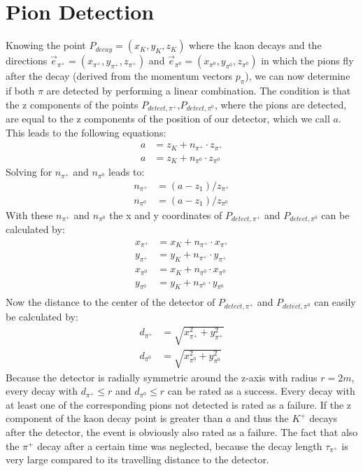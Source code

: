 \documentclass[a4paper,parskip,11pt, DIV12]{scrreprt}
\begin{document}
\clearpage


\section{Pion Detection} \label{sec:pdetection}

Knowing the point $P_{decay}=(x_K,y_K,z_K)$  where the kaon decays and the directions $\vec{e}_{\pi^+}=(x_{\pi^+},y_{\pi^+},z_{\pi^+})$ and $\vec{e}_{\pi^0}=(x_{\pi^0},y_{\pi^0},z_{\pi^0})$ in which the pions fly after the decay (derived from the momentum vectors $p_{\pi}$), we can now determine if both $\pi$ are detected by performing a linear combination. The condition is that the z components of the points $P_{detect,\pi^+}$,$P_{detect,\pi^0}$, where the pions are detected, are equal to the z components of the position of our detector, which we call $a$. This leads to the following equations:
\begin{align*}
a &= z_K + n_{\pi^+} \cdot z_{\pi^+} \\ 
a &= z_K + n_{\pi^0} \cdot z_{\pi^0}
\end{align*} 
Solving for $n_{\pi^+}$ and  $n_{\pi^0}$ leads to: 
\begin{align*}
n_{\pi^+} &= (a-z_1)/z_{\pi^+}\\
n_{\pi^0} &= (a-z_1)/z_{\pi^0}
\end{align*}
With these $n_{\pi^+}$ and $n_{\pi^0}$ the x and y coordinates of $P_{detect,\pi^+}$ and $P_{detect,\pi^0}$ can be calculated by:
\begin{align*}
x_{\pi^+} &= x_K+n_{\pi^+} \cdot x_{\pi^+}\\
y_{\pi^+} &= y_K+n_{\pi^+} \cdot y_{\pi^+}\\
x_{\pi^0} &= x_K+n_{\pi^0} \cdot x_{\pi^0}\\
y_{\pi^0} &= y_K+n_{\pi^0} \cdot y_{\pi^0}\\
\end{align*}
Now the distance to the center of the detector of $P_{detect,\pi^+}$ and $P_{detect,\pi^0}$ can easily be calculated by:
\begin{align*}
d_{\pi^+} &= \sqrt{x_{\pi^+}^2 + y_{\pi^+}^2}\\
d_{\pi^0} &= \sqrt{x_{\pi^0}^2 +  y_{\pi^0}^2} 
\end{align*}
Because the detector is radially symmetric around the z-axis with radius $r=2m$, every decay with $d_{\pi^+} \leq r$ and $d_{\pi^0} \leq r$ can be rated as a success. Every decay with at least one of the corresponding pions not detected is rated as a failure. 
If the z component of the kaon decay point is greater than $a$ and thus the $K^+$ decays after the detector, the event is obviously also rated as a failure. The fact that also the $\pi^+$ decay after a certain time was neglected, because the decay length $\tau_{\pi^+}$ is very large compared to its travelling distance to the detector.
\end{document}
